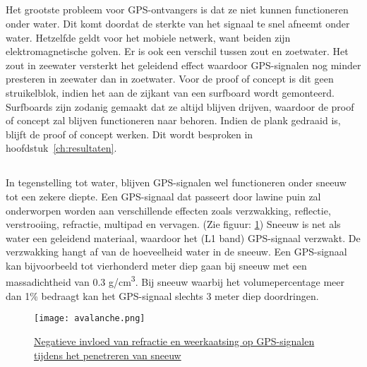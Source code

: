 \subsection{}
Het grootste probleem voor GPS-ontvangers is dat ze niet kunnen functioneren onder water. Dit komt doordat de sterkte van het signaal te snel afneemt onder water. Hetzelfde geldt voor het mobiele netwerk, want beiden zijn elektromagnetische golven. \autocite{underwater} Er is ook een verschil tussen zout en zoetwater. Het zout in zeewater versterkt het geleidend effect waardoor GPS-signalen nog minder presteren in zeewater dan in zoetwater. Voor de proof of concept is dit geen struikelblok, indien het aan de zijkant van een surfboard wordt gemonteerd. Surfboards zijn zodanig gemaakt dat ze altijd blijven drijven, waardoor de proof of concept zal blijven functioneren naar behoren. Indien de plank gedraaid is, blijft de proof of concept werken. Dit wordt besproken in hoofdstuk~\ref{ch:resultaten}.
\subsection{}
In tegenstelling tot water, blijven GPS-signalen wel functioneren onder sneeuw tot een zekere diepte. Een GPS-signaal dat passeert door lawine puin zal onderworpen worden aan verschillende effecten zoals verzwakking, reflectie, verstrooiing, refractie, multipad en vervagen. (Zie figuur: \ref{fig:avalanche}) Sneeuw is net als water een geleidend materiaal, waardoor het (L1 band) GPS-signaal verzwakt. De verzwakking hangt af van de hoeveelheid water in de sneeuw. Een GPS-signaal kan bijvoorbeeld tot vierhonderd meter diep gaan bij sneeuw met een massadichtheid van 0.3 g/cm\textsuperscript{3}. Bij sneeuw waarbij het volumepercentage meer dan 1\% bedraagt kan het GPS-signaal slechts 3 meter diep doordringen.\autocite{avalanche_gps}
\begin{figure}
    \texttt{[image: avalanche.png]}
    \caption[Negatieve invloed van refractie en weerkaatsing]{\href{https://www.researchgate.net/figure/Signal-Paths-in-Avalanche-Debris_fig1_253280455}{Negatieve invloed van refractie en weerkaatsing op GPS-signalen tijdens het penetreren van sneeuw \autocite{avalanche_gps}}}
    \label{fig:avalanche}
\end{figure}
\pagebreak